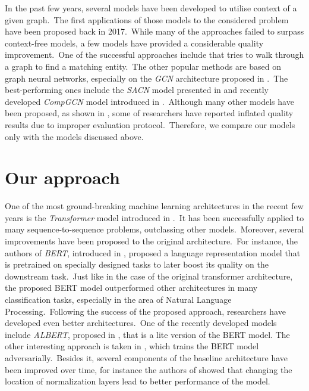 \documentclass[longabstract, english, mgr]{iithesis}
\theoremstyle{default_theorem_style}\newtheorem{theorem}{Theorem}
\theoremstyle{default_theorem_style}\newtheorem{definition}{Definition}
\begin{document}
\noindent In the past few years, several models have been developed to utilise context of a given graph.\ The first
applications of those models to the considered problem have been proposed back in 2017.\ While many of the
approaches failed to surpass context-free models, a few models have provided a considerable quality
improvement.\ One of the successful approaches include \cite{go_for_a_walk_model} that tries to walk through a graph
to find a matching entity.\ The other popular methods are based on graph neural
networks, especially on the \textit{GCN} architecture proposed in \cite{gcn_model}.\ The best-performing ones
include the \textit{SACN} model presented in \cite{sacn_model} and recently developed \textit{CompGCN} model
introduced in \cite{comp_gcn_model}.\ Although many other models have been proposed, as shown in
\cite{re_evaluation}, some of researchers have reported inflated quality results due to improper evaluation
protocol.\ Therefore, we compare our models only with the models discussed above.

\section{Our approach}

One of the most ground-breaking machine learning architectures in the recent few years is the \textit{Transformer} model
introduced in \cite{transformer_model}.\ It has been successfully applied to many sequence-to-sequence problems,
outclassing other models.\ Moreover, several improvements have been proposed to the original architecture.\ For
instance, the authors of \textit{BERT}, introduced in \cite{bert_model}, proposed a language
representation model that is pretrained on specially designed tasks to later boost its quality on the downstream
task.\ Just like in the case of the original transformer architecture, the proposed BERT model outperformed other
architectures in many classification tasks, especially in the area of Natural Language Processing.\ Following the
success of the proposed approach, researchers have developed even better architectures.\ One of the recently
developed models include \textit{ALBERT}, proposed in \cite{albert_model}, that is a lite version of the BERT model.
The other interesting approach is taken in \cite{electra_model}, which trains the BERT model adversarially.\ Besides it,
several components of the baseline architecture have been improved over time, for instance the authors of
\cite{layer_normalization_in_transformers} showed that changing the location of normalization layers lead to better
performance of the model.\newline
\end{document}
